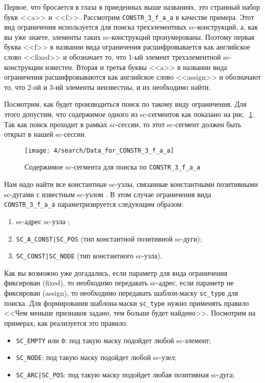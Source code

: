 Первое, что бросается в глаза в приеденных выше названиях, это
странный набор букв <<a>> и <<f>>. Рассмотрим
\lstinline|CONSTR_3_f_a_a| в качестве примера. Этот вид ограничения
используется для поиска трехэлементных sc-конструкций, а, как вы уже
знаете, элементы таких sc-конструкций пронумерованы. Поэтому первая
буква <<f>> в названии вида ограничения расшифровывается как
английское слово <<fixed>> и обозначает то, что 1-ый элемент
трехэлементной sc-конструкции известен. Вторая и третья буквы <<a>> в
названии вида ограничения расшифровываются как английское слово
<<assign>> и обозначают то, что 2-ой и 3-ий элементы неизвестны, и их
необходимо найти.

Посмотрим, как будет производиться поиск по такому виду
ограничения. Для этого допустим, что содержимое одного из sc-сегментов
как показано на рис.~\ref{fig:Data_for_CONSTR_3_f_a_a}. Так как поиск
проходит в рамках sc-сессии, то этот sc-сегмент должен быть открыт в
нашей sc-сессии.

\begin{figure}[h!]
  \centering
  \texttt{[image: 4/search/Data\_for\_CONSTR\_3\_f\_a\_a]}
  \caption{Содержимое sc-сегмента для поиска по \lstinline|CONSTR_3_f_a_a|}
  \label{fig:Data_for_CONSTR_3_f_a_a}
\end{figure}

Нам надо найти все константные sc-узлы, связанные константными
позитивными sc-дугами с известным sc-узлом . В этом случае
ограничения вида \lstinline|CONSTR_3_f_a_a| параметризируется
следующим образом:
\begin{enumerate}
\item sc-адрес sc-узла ;
\item \lstinline+SC_A_CONST|SC_POS+ (тип константной позитивной sc-дуги);
\item \lstinline+SC_CONST|SC_NODE+ (тип константного sc-узла).
\end{enumerate}

Как вы возможно уже догадались, если параметр для вида ограничения
фиксирован (fixed), то необходимо передавать sc-адрес, если параметр
не фиксирован (assign), то необходимо передавать шаблон-маску
\lstinline|sc_type| для поиска. Для формирования шаблона-маски
\lstinline|sc_type| нужно применять правило <<Чем меньше признаков
задано, тем больше будет найдено>>. Посмотрим на примерах, как
реализуется это правило:
\begin{itemize}
\item \lstinline|SC_EMPTY| или \lstinline|0|: под такую маску подойдет
  любой sc-элемент;
\item \lstinline|SC_NODE|: под такую маску подойдет любой sc-узел;
\item \lstinline+SC_ARC|SC_POS+: под такую маску подойдет любая
  позитивная sc-дуга;
\end{itemize}

